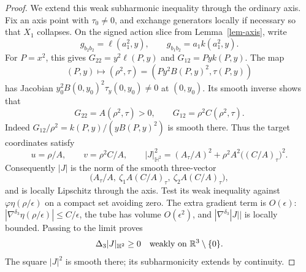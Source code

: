 \documentclass[letterpaper]{amsart}
\theoremstyle{definition}
\theoremstyle{remark}
\begin{document}
\begin{proof}
We extend this weak subharmonic inequality through the ordinary axis. Fix an axis point with $\tau_0\ne0$, and exchange generators locally if necessary so that $X_1$ collapses. On the signed action slice from Lemma~\ref{lem-axis}, write
\[
 g_{b_2b_2}=\ell(a_1^2,y),\qquad g_{b_1b_2}=a_1k(a_1^2,y).
\]
For $P=x^2$, this gives $G_{22}=y^2\ell(P,y)$ and $G_{12}=Py k(P,y)$. The map
\[
 (P,y)\longmapsto(\rho^2,\tau)
       =(Py^2B(P,y)^2,\tau(P,y))
\]
has Jacobian $y_0^2B(0,y_0)^2\tau_y(0,y_0)\ne0$ at $(0,y_0)$. Its smooth inverse shows that
\[
 G_{22}=A(\rho^2,\tau)>0,\qquad G_{12}=\rho^2C(\rho^2,\tau).
\]
Indeed $G_{12}/\rho^2=k(P,y)/(yB(P,y)^2)$ is smooth there. Thus the target coordinates satisfy
\[
 u=\rho/A,\qquad v=\rho^2C/A,\qquad
 |J|_{\mathbb H^2}^2
   =(A_\tau/A)^2+\rho^2A^2\bigl((C/A)_\tau\bigr)^2.
\]
Consequently $|J|$ is the norm of the smooth three-vector
\[
 \bigl(A_\tau/A,\ \zeta_1A(C/A)_\tau,\ \zeta_2A(C/A)_\tau\bigr),
\]
and is locally Lipschitz through the axis. Test its weak inequality against $\varphi\eta(\rho/\epsilon)$ on a compact set avoiding zero. The extra gradient term is $O(\epsilon)$: $|\nabla^{\delta_3}\eta(\rho/\epsilon)|\le C/\epsilon$, the tube has volume $O(\epsilon^2)$, and $|\nabla^{\delta_3}|J||$ is locally bounded. Passing to the limit proves
\[
 \Delta_3|J|_{\mathbb H^2}\ge0
 \quad\hbox{weakly on }\mathbb R^3\setminus\{0\}.
\]
The square $|J|^2$ is smooth there; its subharmonicity extends by continuity. 


\end{proof}
\end{document}
